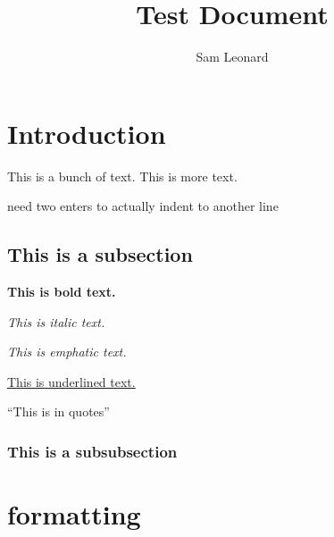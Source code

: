 \documentclass[titlepage]{article}
\author{Sam Leonard}
\title{Test Document}
\begin{document}
\maketitle

\section{Introduction}

This is a bunch of text.
This is more text.

need two enters to actually indent to another line
\subsection{This is a subsection}

\textbf{This is bold text.}

\textit{This is italic text.}

\emph{This is emphatic text.}

\underline{This is underlined text.}

``This is in quotes''

\subsubsection{This is a subsubsection}
\section{formatting}
\end{document}
